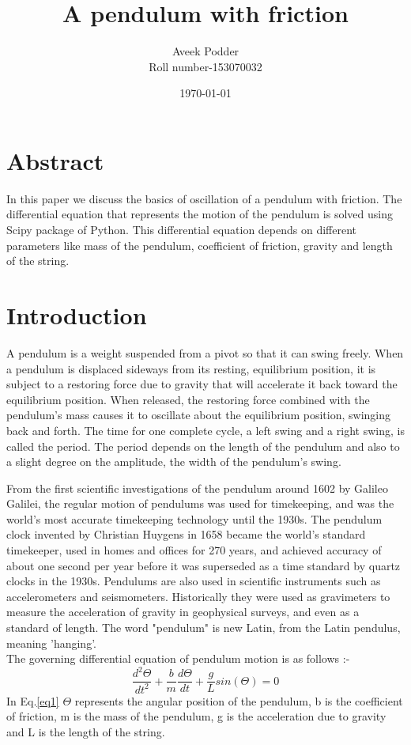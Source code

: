 \documentclass[a4paper]{article}
\begin{document}
\title{A pendulum with friction}
\author{Aveek Podder\\
Roll number-153070032}
\date{\today}
\maketitle
\clearpage
\tableofcontents
\clearpage

\section*{Abstract}
    In this paper we discuss the basics of oscillation of a pendulum with friction. The differential equation that represents the motion of the pendulum is solved using Scipy package of Python. This differential equation depends on different parameters like mass of the pendulum, coefficient of friction, gravity and length of the string.

\section{Introduction}
A pendulum is a weight suspended from a pivot so that it can swing freely.\cite{Miri} When a pendulum is displaced sideways from its resting, equilibrium position, it is subject to a restoring force due to gravity that will accelerate it back toward the equilibrium position. When released, the restoring force combined with the pendulum's mass causes it to oscillate about the equilibrium position, swinging back and forth. The time for one complete cycle, a left swing and a right swing, is called the period. The period depends on the length of the pendulum and also to a slight degree on the amplitude, the width of the pendulum's swing.

From the first scientific investigations of the pendulum around 1602 by Galileo Galilei, the regular motion of pendulums was used for timekeeping, and was the world's most accurate timekeeping technology until the 1930s.\cite{Marr} The pendulum clock invented by Christian Huygens in 1658 became the world's standard timekeeper, used in homes and offices for 270 years, and achieved accuracy of about one second per year before it was superseded as a time standard by quartz clocks in the 1930s. Pendulums are also used in scientific instruments such as accelerometers and seismometers. Historically they were used as gravimeters to measure the acceleration of gravity in geophysical surveys, and even as a standard of length. The word "pendulum" is new Latin, from the Latin pendulus, meaning 'hanging'.\cite{Morr}\\
The governing differential equation of pendulum motion is as follows :-
\begin{equation}\label{eq1}
    \frac{d^2\Theta}{dt^2} + \frac{b}{m}\frac{d\Theta}{dt} + \frac{g}{L}sin(\Theta) = 0
\end{equation}
In Eq.\ref{eq1} \textit{$\Theta$} represents the  angular position of the pendulum, b is the coefficient of friction, m is the mass of the pendulum, g is the acceleration due to gravity and L is the length of the string.
\end{document}
